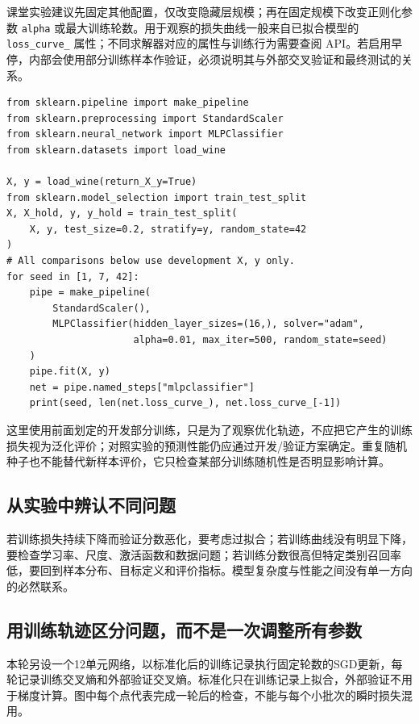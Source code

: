 课堂实验建议先固定其他配置，仅改变隐藏层规模；再在固定规模下改变正则化参数 \texttt{alpha} 或最大训练轮数。用于观察的损失曲线一般来自已拟合模型的 \texttt{loss\_curve\_} 属性；不同求解器对应的属性与训练行为需要查阅 API。若启用早停，内部会使用部分训练样本作验证，必须说明其与外部交叉验证和最终测试的关系。

\begin{lstlisting}[caption={观察 MLP 训练损失与初始化稳定性}]
from sklearn.pipeline import make_pipeline
from sklearn.preprocessing import StandardScaler
from sklearn.neural_network import MLPClassifier
from sklearn.datasets import load_wine

X, y = load_wine(return_X_y=True)
from sklearn.model_selection import train_test_split
X, X_hold, y, y_hold = train_test_split(
    X, y, test_size=0.2, stratify=y, random_state=42
)
# All comparisons below use development X, y only.
for seed in [1, 7, 42]:
    pipe = make_pipeline(
        StandardScaler(),
        MLPClassifier(hidden_layer_sizes=(16,), solver="adam",
                      alpha=0.01, max_iter=500, random_state=seed)
    )
    pipe.fit(X, y)
    net = pipe.named_steps["mlpclassifier"]
    print(seed, len(net.loss_curve_), net.loss_curve_[-1])
\end{lstlisting}

这里使用前面划定的开发部分训练，只是为了观察优化轨迹，不应把它产生的训练损失视为泛化评价；对照实验的预测性能仍应通过开发/验证方案确定。重复随机种子也不能替代新样本评价，它只检查某部分训练随机性是否明显影响计算。

\subsection*{从实验中辨认不同问题}
若训练损失持续下降而验证分数恶化，要考虑过拟合；若训练曲线没有明显下降，要检查学习率、尺度、激活函数和数据问题；若训练分数很高但特定类别召回率低，要回到样本分布、目标定义和评价指标。模型复杂度与性能之间没有单一方向的必然联系。

\subsection{用训练轨迹区分问题，而不是一次调整所有参数}
本轮另设一个12单元网络，以标准化后的训练记录执行固定轮数的SGD更新，每轮记录训练交叉熵和外部验证交叉熵。标准化只在训练记录上拟合，外部验证不用于梯度计算。图中每个点代表完成一轮后的检查，不能与每个小批次的瞬时损失混用。

